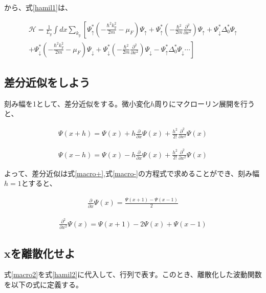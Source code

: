\documentclass{jsarticle}
\begin{document}
		から、式\eqref{hamil1}は、

		\begin{align}
			\mathcal{H}= \frac{1}{L_y}\int dx \sum_{k_y}
			\left[ \Psi_\uparrow^\ast \left( -\frac{\hbar^2k_y^2}{2m}-\mu_F \right)\Psi_\uparrow
			+\Psi_\uparrow^\ast \left(- \frac{\hbar^2}{2m}\frac{\partial^2}{\partial x^2}\right)\Psi_\uparrow
			+\Psi_\downarrow^\ast \Delta_0^\ast \Psi_\uparrow \right. \nonumber \\ \left.+
			\Psi_\downarrow^\ast \left( -\frac{\hbar^2k_y^2}{2m}-\mu_F \right)\Psi_\downarrow
			+\Psi_\downarrow^\ast \left(- \frac{\hbar^2}{2m}\frac{\partial^2}{\partial x^2} \right) \Psi_\downarrow
			-\Psi_\uparrow^\ast \Delta_0^\ast \Psi_\downarrow \cdots
			\right]
			\label{hamil2}
		\end{align}

		\subsection{差分近似をしよう}
		刻み幅を1として、差分近似をする。微小変化$h$周りにマクローリン展開を行うと、

		\begin{align}
			\Psi\left(x+h\right)=\Psi\left(x\right)+h\frac{\partial}{\partial x}\Psi\left(x\right)+\frac{h^2}{2!}\frac{\partial^2}{\partial x^2}\Psi\left(x\right)
			\label{macro+}
		\end{align}

		\begin{align}
			\Psi\left(x-h\right)=\Psi\left(x\right)-h\frac{\partial}{\partial x}\Psi\left(x\right)+\frac{h^2}{2!}\frac{\partial^2}{\partial x^2}\Psi\left(x\right)
			\label{macro-}
		\end{align}

		よって、差分近似は式\eqref{macro+},式\eqref{macro-}の方程式で求めることができ、刻み幅$h=1$とすると、

		\begin{align}
			\frac{\partial}{\partial x}\Psi\left(x\right)=
			\frac{\Psi\left(x+1\right)-\Psi\left(x-1\right)}{2}
		\end{align}

		\begin{align}
			\frac{\partial^2}{\partial x^2}\Psi\left(x\right)=
			\Psi\left(x+1\right)-2\Psi\left(x\right)+\Psi\left(x-1\right)
			\label{macro2}
		\end{align}

		\subsection{xを離散化せよ}
		式\eqref{macro2}を式\eqref{hamil2}に代入して、行列で表す。このとき、離散化した波動関数を以下の式に定義する。
\end{document}
